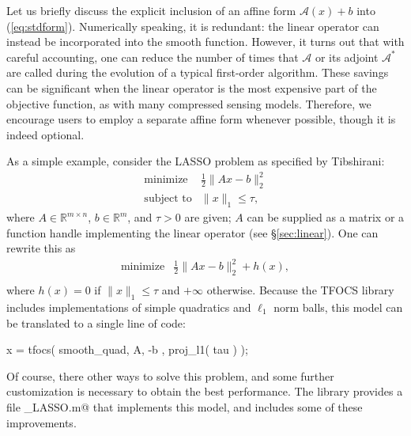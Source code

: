 \documentclass{article}
\newcommand{\cA}{\ensuremath{\mathcal{A}}}    %
\newcommand\thalf{{\textstyle\frac{1}{2}}}
\newcommand{\<}{\langle}
\renewcommand{\>}{\rangle}
\newcommand{\R}{\mathbb{R}}
\begin{document}
Let us briefly discuss the explicit inclusion of an affine
form $\cA(x)+b$ into (\ref{eq:stdform}). Numerically speaking, it
is redundant: the linear operator can instead be incorporated into the
smooth function. However, it turns out that
with careful accounting, one can reduce the number of times that
$\cA$ or its adjoint $\cA^*$ are called during the evolution of a typical
first-order algorithm. These savings can be significant when
the linear operator is the most expensive part of the objective function,
as with many compressed sensing models. Therefore, we
encourage users to employ a separate affine form whenever possible,
though it is indeed optional.

As a simple example, consider the LASSO problem as specified by Tibshirani:
\begin{equation}
	\begin{array}{ll}
		\text{minimize}   & \thalf\|Ax-b\|_2^2 \\
		\text{subject to} & \|x\|_1 \leq \tau, 
	\end{array}
\end{equation}
where $A\in\R^{m\times n}$, $b\in\R^m$, and $\tau>0$ are given; $A$
can be supplied as a matrix or a function handle implementing the
linear operator (see \S\ref{sec:linear}). One can rewrite this as
\[
	\begin{array}{ll}
		\text{minimize}   & \thalf\|Ax-b\|_2^2 + h(x),\\
	\end{array}
\]
where $h(x) = 0$ if $\|x\|_1 \le \tau$ and $+\infty$
otherwise. Because the TFOCS library includes implementations of
simple quadratics and $\ell_1$ norm balls, this model can be
translated to a single line of code:
\begin{code}
	x = tfocs( smooth_quad, { A, -b }, proj_l1( tau )  );
\end{code}
Of course, there other ways to solve this problem, and some further
customization is necessary to obtain the best performance. The
library provides a file \verb@solver_LASSO.m@ that implements
this model, and includes some of these improvements.
\end{document}
